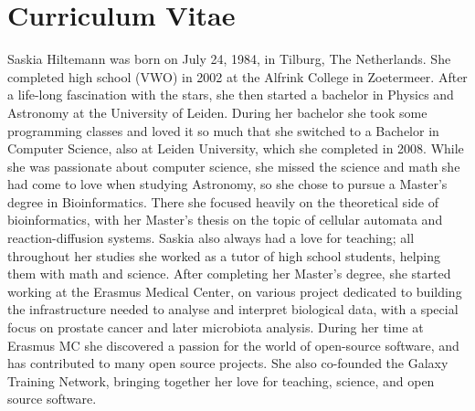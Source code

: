 \chapter{Curriculum Vitae}
\label{AppendixB}

Saskia Hiltemann was born on July 24, 1984, in Tilburg, The Netherlands. She completed high school (VWO) in 2002 at the Alfrink College in Zoetermeer. After a life-long fascination with the stars, she then started a bachelor in Physics and Astronomy at the University of Leiden. During her bachelor she took some programming classes and loved it so much that she switched to a Bachelor in Computer Science, also at Leiden University, which she completed in 2008. While she was passionate about computer science, she missed the science and math she had come to love when studying Astronomy, so she chose to pursue a Master's degree in Bioinformatics. There she focused heavily on the theoretical side of bioinformatics, with her Master's thesis on the topic of cellular automata and reaction-diffusion systems. Saskia also always had a love for teaching; all throughout her studies she worked as a tutor of high school students, helping them with math and science. After completing her Master's degree, she started working at the Erasmus Medical Center, on various project dedicated to building the infrastructure needed to analyse and interpret biological data, with a special focus on prostate cancer and later microbiota analysis. During her time at Erasmus MC she discovered a passion for the world of open-source software, and has contributed to many open source projects. She also co-founded the Galaxy Training Network, bringing together her love for teaching, science, and open source software.
